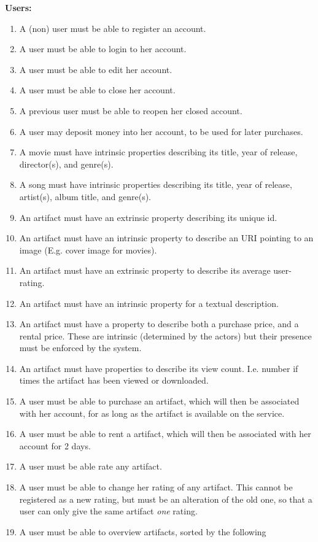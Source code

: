 \textbf{Users:}
\begin{enumerate}
\item A (non) user must be able to register an account.
\item A user must be able to login to her account.
\item A user must be able to edit her account.
\item A user must be able to close her account.
\item A previous user must be able to reopen her closed account.
\item A user may deposit money into her account, to be used for later
	purchases.
\item A movie must have intrinsic properties describing its title, year of
	release, director(s), and genre(s).
\item A song must have intrinsic properties describing its title, year of
	release, artist(s), album title, and genre(s).
\item An artifact must have an extrinsic property describing its unique id.
\item An artifact must have an intrinsic property to describe an URI pointing to
	an image (E.g. cover image for movies).
\item An artifact must have an extrinsic property to describe its average
	user-rating.
\item An artifact must have an intrinsic property for a textual description.
\item An artifact must have a property to describe both a purchase price, and a
	rental price. These are intrinsic (determined by the actors) but their
	presence must be enforced by the system.
\item An artifact must have properties to describe its view count. I.e. number
	if times the artifact has been viewed or downloaded.
\item A user must be able to purchase an artifact, which will then be associated
	with her account, for as long as the artifact is available on the
	service.
\item A user must be able to rent a artifact, which will then be associated
	with her account for 2 days.
\item A user must be able rate any artifact.
\item A user must be able to change her rating of any artifact.
	This cannot be registered as a new rating, but must be an alteration of
	the old one, so that a user can only give the same artifact \emph{one}
	rating.
\item A user must be able to overview artifacts, sorted by the following

\end{enumerate}
